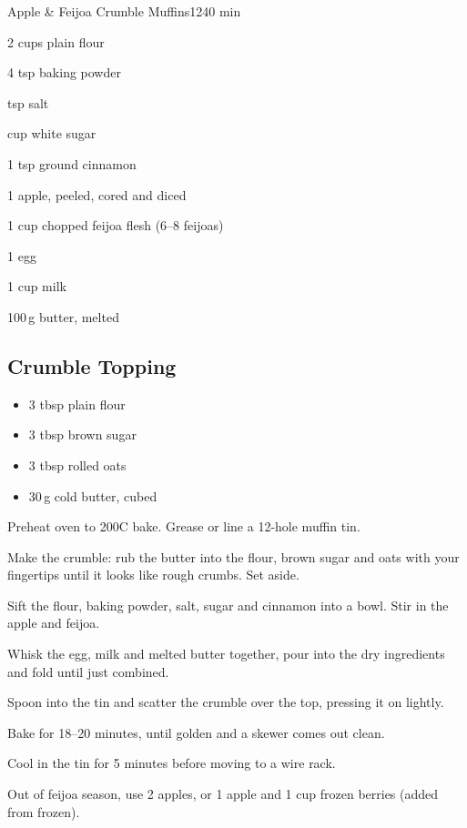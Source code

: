 \begin{recipebox}{Apple \& Feijoa Crumble Muffins}{12}{40 min}
\begin{ingredients}
  \item 2 cups plain flour
  \item 4 tsp baking powder
  \item {} tsp salt
  \item {} cup white sugar
  \item 1 tsp ground cinnamon
  \item 1 apple, peeled, cored and diced
  \item 1 cup chopped feijoa flesh (6--8 feijoas)
  \item 1 egg
  \item 1 cup milk
  \item 100\,g butter, melted
\end{ingredients}

\subsection*{Crumble Topping}
\begin{itemize}[leftmargin=2em]
  \item 3 tbsp plain flour
  \item 3 tbsp brown sugar
  \item 3 tbsp rolled oats
  \item 30\,g cold butter, cubed
\end{itemize}

\begin{method}
  \item Preheat oven to 200\degree C bake. Grease or line a 12-hole muffin tin.
  \item Make the crumble: rub the butter into the flour, brown sugar and oats with your fingertips until it looks like rough crumbs. Set aside.
  \item Sift the flour, baking powder, salt, sugar and cinnamon into a bowl. Stir in the apple and feijoa.
  \item Whisk the egg, milk and melted butter together, pour into the dry ingredients and fold until just combined.
  \item Spoon into the tin and scatter the crumble over the top, pressing it on lightly.
  \item Bake for 18--20 minutes, until golden and a skewer comes out clean.
  \item Cool in the tin for 5 minutes before moving to a wire rack.
\end{method}

\begin{notes}
Out of feijoa season, use 2 apples, or 1 apple and 1 cup frozen berries (added from frozen).
\end{notes}
\end{recipebox}
